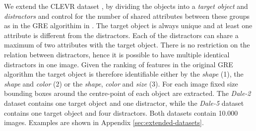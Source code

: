 \documentclass[11pt]{article}
\begin{document}
We extend the CLEVR dataset \citep{Johnson2016}, by dividing the objects into a \emph{target object} and \emph{distractors}
and control for the number of shared attributes between these groups as %
in the GRE algorithim in \citep{Dale1995}.
The target object is always unique and at least one attribute is different from the distractors.
Each of the distractors can share a maximum of two attributes with the target object.
There is no restriction on the relation between distractors, hence it is possible to have multiple identical distractors in one image.
Given the ranking of features in the original GRE algorithm the target object is therefore identifiable either by the \emph{shape} (1), the \emph{shape} and \emph{color} (2) or the \emph{shape}, \emph{color} and \emph{size} (3).
For each image fixed size bounding boxes around the centre-point of each object are extracted.
%
The \emph{Dale-2} dataset contains one target object and one distractor, while the \emph{Dale-5} dataset contains one target object and four distractors.
Both datasets contain 10.000 images.
Examples are shown in 
Appendix \ref{sec:extended-datasets}. %

\end{document}
